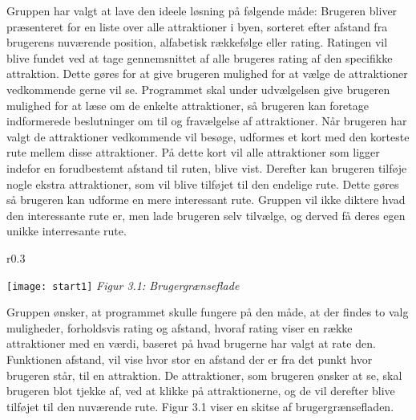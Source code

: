 Gruppen har valgt at lave den ideele løsning på følgende måde:\newline
\newline
Brugeren bliver præsenteret for en liste over alle attraktioner i byen, sorteret efter afstand fra brugerens nuværende position, alfabetisk rækkefølge eller rating. \newline
Ratingen vil blive fundet ved at tage gennemsnittet af alle brugeres rating af den specifikke attraktion. \newline
Dette gøres for at give brugeren mulighed for at vælge de attraktioner vedkommende gerne vil se.\newline
\newline
Programmet skal under udvælgelsen give brugeren mulighed for at læse om de enkelte attraktioner, så brugeren kan foretage indformerede beslutninger om til og fravælgelse af attraktioner.\newline
\newline
Når brugeren har valgt de attraktioner vedkommende vil besøge, udformes et kort med den korteste rute mellem disse attraktioner. På dette kort vil alle attraktioner som ligger indefor en forudbestemt afstand til ruten, blive vist. Derefter kan brugeren tilføje nogle ekstra attraktioner, som vil blive tilføjet til den endelige rute.\newline
Dette gøres så brugeren kan udforme en mere interessant rute. Gruppen vil ikke diktere hvad den interessante rute er, men lade brugeren selv tilvælge, og derved få deres egen unikke interresante rute. \newline 
 

\begin{wrapfigure}{r}{0.3\textwidth}
  \vspace{-20pt}
  \begin{center}
    \texttt{[image: start1]} \newline
    \textit{Figur 3.1: Brugergrænseflade}\newline
  \end{center}
  \vspace{-20pt}
  \vspace{-20pt}
\end{wrapfigure}


Gruppen ønsker, at programmet skulle fungere på den måde, at der findes to valg muligheder, forholdsvis rating og afstand, hvoraf rating viser en række attraktioner med en værdi, baseret på hvad brugerne har valgt at rate den. Funktionen afstand, vil vise hvor stor en afstand der er fra det punkt hvor brugeren står, til en attraktion. De attraktioner, som brugeren ønsker at se, skal brugeren blot tjekke af, ved at klikke på attraktionerne, og de vil derefter blive tilføjet til den nuværende rute. Figur 3.1 viser en skitse af brugergrænsefladen. \newline
\newline
\newline
\newline

